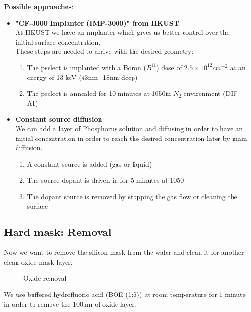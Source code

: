 \textbf{Possible approaches}:
\begin{itemize}
	\item \textbf{"CF-3000 Implanter (IMP-3000)" from HKUST} \\
	At HKUST we have an implanter which gives us better control over the initial surface concentration. \\
	These steps are needed to arrive with the desired geometry:
	\begin{enumerate}
		\item The pselect is implanted with a Boron ($B^{11}$) dose of $2.5\times10^{12}cm^{-2}$ at an energy of 13 keV  (43nm$\pm$18nm deep)
		\item The pselect is annealed for 10 minutes at 1050\degreesC in $N_2$ environment (DIF-A1)
	\end{enumerate}
	\item \textbf{Constant source diffusion} \\
	We can add a layer of Phosphorus solution and diffusing in order to have an initial concentration in order to reach the desired concentration later by main diffusion.
		\begin{enumerate}
		\item A constant source is added (gas or liquid)
		\item The source dopant is driven in for 5 minutes at 1050\degreesC
		\item The dopant source is removed by stopping the gas flow or cleaning the surface
	\end{enumerate}
\end{itemize}

\subsection{Hard mask: Removal}

Now we want to remove the silicon mask from the wafer and clean it for another clean oxide mask layer.

\begin{figure}[H]
	\centering
	\begin{tikzpicture}[node distance = 3cm, auto, thick,scale=\CrossSectionOnly, every node/.style={transform shape}]
		
	\end{tikzpicture}
	\drawStepArrow{}
	\begin{tikzpicture}[node distance = 3cm, auto, thick,scale=\CrossSectionOnly, every node/.style={transform shape}]
		
	\end{tikzpicture}
	\caption{Oxide removal}
\end{figure}

We use buffered hydrofluoric acid (BOE (1:6)) at room temperature for 1 minute in order to remove the 100nm of oxide layer.
